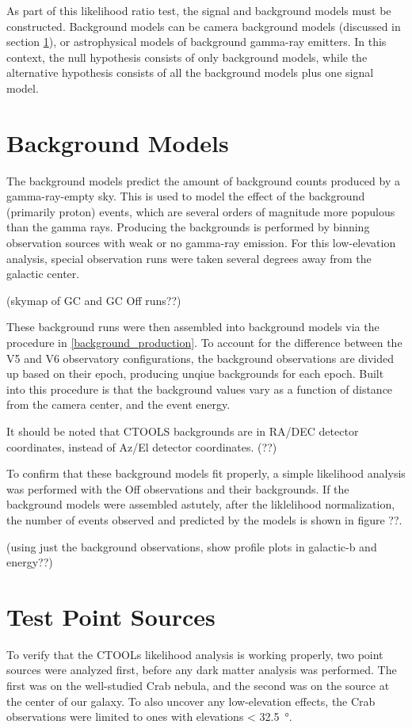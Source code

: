   As part of this likelihood ratio test, the signal and background models must be constructed.
  Background models can be camera background models (discussed in section \ref{sec:bkgmodels}), or astrophysical models of background gamma-ray emitters.
  In this context, the null hypothesis consists of only background models, while the alternative hypothesis consists of all the background models plus one signal model.

\section{Background Models}\label{sec:bkgmodels}
  The background models predict the amount of background counts produced by a gamma-ray-empty sky.
  This is used to model the effect of the background (primarily proton) events, which are several orders of magnitude more populous than the gamma rays.
  Producing the backgrounds is performed by binning observation sources with weak or no gamma-ray emission.
  For this low-elevation analysis, special observation runs were taken several degrees away from the galactic center.

  (skymap of GC and GC Off runs??)

  These background runs were then assembled into background models via the procedure in \ref{background_production}.
  To account for the difference between the V5 and V6 observatory configurations, the background observations are divided up based on their epoch, producing unqiue backgrounds for each epoch.
  Built into this procedure is that the background values vary as a function of distance from the camera center, and the event energy.

  It should be noted that CTOOLS backgrounds are in RA/DEC detector coordinates, instead of Az/El detector coordinates. (??)

  To confirm that these background models fit properly, a simple likelihood analysis was performed with the Off observations and their backgrounds.
  If the background models were assembled astutely, after the liklelihood normalization, the number of events observed and predicted by the models is shown in figure ??.

  (using just the background observations, show profile plots in galactic-b and energy??)

\section{Test Point Sources}
  To verify that the CTOOLs likelihood analysis is working properly, two point sources were analyzed first, before any dark matter analysis was performed.
  The first was on the well-studied Crab nebula, and the second was on the source at the center of our galaxy.
  To also uncover any low-elevation effects, the Crab observations were limited to ones with elevations < \SI{32.5}{\degree}.

